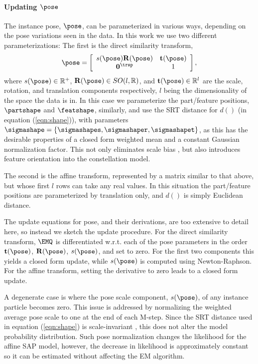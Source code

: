 \paragraph{Updating $\pose$}
The instance pose, $\pose$, can be parameterized in various ways, depending on the pose variations seen in the data. In this work we use two different parameterizations: The first is the direct similarity transform, 
\begin{equation}
\pose=\left[\begin{array}{cc}
s(\pose)\mathbf{R}(\pose) & \mathbf{t}(\pose)\\
\mathbf{0}^\trsp & 1\end{array}\right],
\label{eq:dsmatrix}
\end{equation}
where $s(\pose)\in\mathbb{R}^+$, $\mathbf{R}(\pose)\in SO(l,\mathbb{R})$, and $\mathbf{t}(\pose)\in\mathbb{R}^l$ are the scale, rotation, and translation components respectively, $l$ being the dimensionality of the space the data is in. In this case we parameterize the part/feature positions, $\partshape$ and $\featshape$, similarly, and use the SRT distance \cite{Pham2011} for $d()$ (in equation (\ref{eqn:shape})), with parameters $\sigmashape = \{\sigmashapes, \sigmashaper, \sigmashapet\}$, as this has the desirable properties of a closed form weighted mean and a constant Gaussian normalization factor. This not only eliminates scale bias \cite{Pham2011}, but also introduces feature orientation into the constellation model.

The second is the affine transform, represented by a matrix similar to that above, but whose first $l$ rows can take any real values. In this situation the part/feature positions are parameterized by translation only, and $d()$ is simply Euclidean distance.

The update equations for pose, and their derivations, are too extensive to detail here, so instead we sketch the update procedure. For the direct similarity transform, $\EMQ$ is differentiated w.r.t. each of the pose parameters in the order $\mathbf{t}(\pose)$, $\mathbf{R}(\pose)$, $s(\pose)$, and set to zero. For the first two components this yields a closed form update, while $s(\pose)$ is computed using Newton-Raphson. For the affine transform, setting the derivative to zero leads to a closed form update.

A degenerate case is where the pose scale component, $s(\pose)$, of any instance particle becomes zero. This issue is addressed by normalizing the weighted average pose scale to one at the end of each M-step. Since the SRT distance used in equation (\ref{eqn:shape}) is scale-invariant \cite{Pham2011}, this does not alter the model probability distribution. Such pose normalization changes the likelihood for the affine SAP model, however, the decrease in likelihood is approximately constant so it can be estimated without affecting the EM algorithm.

